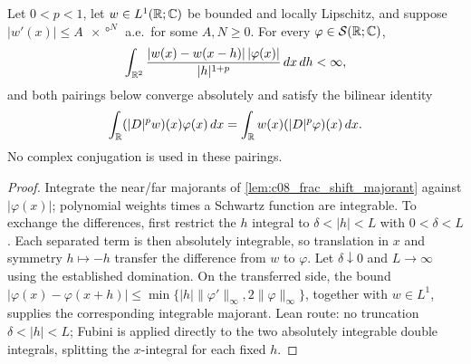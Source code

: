 \begin{lemma}
  \label{lem:c08_frac_pairing_fubini}
  Let $0<p<1$, let $w\in L^1(\mathbb{R};\mathbb{C})$ be bounded and locally Lipschitz, and suppose
  $|w'(x)|\le A\ang{x}^N$ a.e.\ for some $A,N\ge0$. For every $\varphi\in\mathcal S(\mathbb{R};\mathbb{C})$,
  \[
    \int_{\mathbb{R}^2}\frac{|w(x)-w(x-h)|\,|\varphi(x)|}{|h|^{1+p}}\,dx\,dh<\infty,
  \]
  and both pairings below converge absolutely and satisfy the bilinear identity
  \[
    \int_{\mathbb{R}} (|D|^pw)(x)\varphi(x)\,dx
      =\int_{\mathbb{R}} w(x)(|D|^p\varphi)(x)\,dx .
  \]
  No complex conjugation is used in these pairings.
\end{lemma}
\begin{proof}
  Integrate the near/far majorants of \cref{lem:c08_frac_shift_majorant} against $|\varphi(x)|$;
  polynomial weights times a Schwartz function are integrable. To exchange the differences, first
  restrict the $h$ integral to $\delta<|h|<L$ with $0<\delta<L$. Each separated term is then absolutely
  integrable, so translation in $x$ and symmetry $h\mapsto-h$ transfer the difference from $w$ to
  $\varphi$. Let $\delta\downarrow0$ and $L\to\infty$ using the established domination.
  On the transferred side, the bound
  $|\varphi(x)-\varphi(x+h)|\le\min\{|h|\|\varphi'\|_\infty,2\|\varphi\|_\infty\}$,
  together with $w\in L^1$, supplies the corresponding integrable majorant.
  Lean route: no truncation $\delta<|h|<L$; Fubini is applied directly to the two absolutely integrable double integrals, splitting the $x$-integral for each fixed $h$.
\end{proof}

